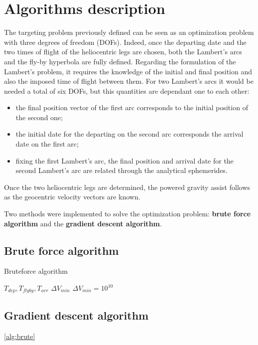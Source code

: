 \section{Algorithms description}
\label{sec:algo_description}

The targeting problem previously defined can be seen as an optimization problem with three degrees of freedom (DOFs). Indeed, once the departing date and the two times of flight of the heliocentric legs are chosen, both the Lambert's arcs and the fly-by hyperbola are fully defined.  
Regarding the formulation of the Lambert's problem, it requires the knowledge of the initial and final position and also the imposed time of flight between them. For two Lambert's arcs it would be needed a total of six DOFs, but this quantities are dependant one to each other:
\begin{itemize}
    [wide,itemsep=3pt,topsep=3pt]
    \item the final position vector of the first arc corresponds to the initial position of the second one;
    \item the initial date for the departing on the second arc corresponds the arrival date on the first arc;
    \item fixing the first Lambert's arc, the final position and arrival date for the second Lambert's arc are related through the analytical ephemerides.
\end{itemize}

\pagebreak

Once the two heliocentric legs are determined, the powered gravity assist follows as the geocentric velocity vectors are known.

Two methods were implemented to solve the optimization problem: \textbf{brute force algorithm} and the \textbf{gradient descent algorithm}.

\subsection{Brute force algorithm}
\label{subsec:brute_force_algo}

\begin{algorithm}
    \caption{Bruteforce algorithm} \label{alg:brute}
    \begin{algorithmic}
    \Require $T_{dep}, T_{fly by}, T_{arr}$
    \Ensure $\Delta V_{min}$
    \State $\Delta V_{min} = 10^{10}$
                \State 
            \EndFor
        \EndFor
    \EndFor
    \end{algorithmic}
\end{algorithm}


\subsection{Gradient descent algorithm}
\label{subsec:gradient_algo}

\autoref{alg:brute}